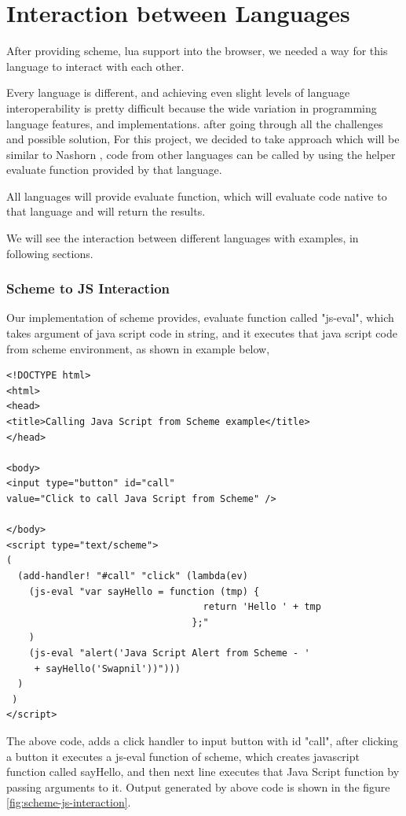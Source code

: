 \chapter{Interaction between Languages}

After providing scheme, lua support into the browser, we needed a way for this language to interact with each other. 

Every language is different, and achieving even slight levels of language interoperability is pretty difficult because the wide variation in programming language features, and implementations. after going through all the challenges and possible solution, For this project, we decided to take approach which will be similar to Nashorn \cite{Juneau2017}, code from other languages can be called by using the helper evaluate function provided by that language.

All languages will provide evaluate function, which will evaluate code native to that language and will return the results.

We will see the interaction between different languages with examples, in following sections.

\subsection{Scheme to JS Interaction}

Our implementation of scheme provides, evaluate function called "js-eval", which takes argument of java script code in string, and it executes that java script code from scheme environment, as shown in example below,

\begin{lstlisting}[frame=single]
<!DOCTYPE html>
<html>
<head>
<title>Calling Java Script from Scheme example</title>
</head>

<body>
<input type="button" id="call" 
value="Click to call Java Script from Scheme" />

</body>
<script type="text/scheme">
(
  (add-handler! "#call" "click" (lambda(ev)
    (js-eval "var sayHello = function (tmp) {
                                   return 'Hello ' + tmp
                                 };"
    )
    (js-eval "alert('Java Script Alert from Scheme - ' 
     + sayHello('Swapnil'))")))
  )
 )
</script>
\end{lstlisting}

The above code, adds a click handler to input button with id "call", after clicking a button it executes a js-eval function of scheme, which creates javascript function called sayHello, and then next line executes that Java Script function by passing arguments to it.  Output generated by above code is shown in the figure \ref{fig:scheme-js-interaction}.

